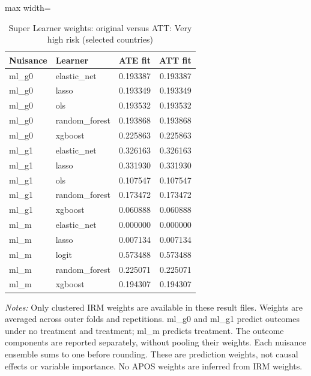 \begin{table}[htbp]
\centering\scriptsize
\caption{Super Learner weights: original versus ATT: Very high risk (selected countries)}
\label{tab:table-ate-att-convex-weights-VeryHighRiskHome-selected-countries}
\begin{adjustbox}{max width=\linewidth}
\begin{tabular}{llrr}
\toprule
Nuisance & Learner & ATE fit & ATT fit \\
\midrule
ml\_g0 & elastic\_net & 0.193387 & 0.193387 \\
ml\_g0 & lasso & 0.193349 & 0.193349 \\
ml\_g0 & ols & 0.193532 & 0.193532 \\
ml\_g0 & random\_forest & 0.193868 & 0.193868 \\
ml\_g0 & xgboost & 0.225863 & 0.225863 \\
ml\_g1 & elastic\_net & 0.326163 & 0.326163 \\
ml\_g1 & lasso & 0.331930 & 0.331930 \\
ml\_g1 & ols & 0.107547 & 0.107547 \\
ml\_g1 & random\_forest & 0.173472 & 0.173472 \\
ml\_g1 & xgboost & 0.060888 & 0.060888 \\
ml\_m & elastic\_net & 0.000000 & 0.000000 \\
ml\_m & lasso & 0.007134 & 0.007134 \\
ml\_m & logit & 0.573488 & 0.573488 \\
ml\_m & random\_forest & 0.225071 & 0.225071 \\
ml\_m & xgboost & 0.194307 & 0.194307 \\
\bottomrule
\end{tabular}
\end{adjustbox}
\par\vspace{3pt}\begin{minipage}{\linewidth}\scriptsize\textit{Notes:} Only clustered IRM weights are available in these result files. Weights are averaged across outer folds and repetitions. ml\_g0 and ml\_g1 predict outcomes under no treatment and treatment; ml\_m predicts treatment. The outcome components are reported separately, without pooling their weights. Each nuisance ensemble sums to one before rounding. These are prediction weights, not causal effects or variable importance. No APOS weights are inferred from IRM weights.\end{minipage}
\end{table}
